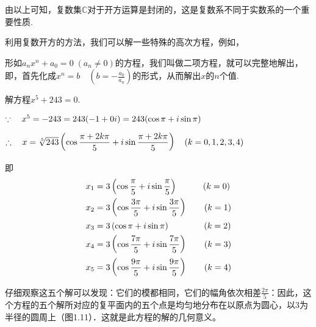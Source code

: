 由以上可知，复数集$\mathbb{C}$对于开方运算是封闭的，这是复数系不同于实数系的一个重要性质.

利用复数开方的方法，我们可以解一些特殊的高次方程，例如，

形如$a_nx^n+a_0=0\; (a_n\ne 0)$的方程，我们叫做二项方程，就可以完整地解出，即，首先化成$x^n=b\quad \left(b=-\frac{a_0}{a_n}\right)$的形式，从而解出$x$的$n$个值.

\begin{example}
    解方程$x^5+243=0$.
\end{example}

\begin{solution}
$\because\quad x^5=-243=243(-1+0i)=243(\cos{\pi}+i\sin{\pi})$

$\therefore\quad x=\sqrt[5]{243}\left(\cos{\dfrac{\pi+2k\pi}{5}}+i\sin{\dfrac{\pi+2k\pi}{5}}\right)\quad (k=0,1,2,3,4)$

即
\[\begin{split}
x_1&=3\left(\cos{\dfrac{\pi}{5}}+i\sin{\dfrac{\pi}{5}}\right)\qquad\quad (k=0)\\
x_2&=3\left(\cos{\dfrac{3\pi}{5}}+i\sin{\dfrac{3\pi}{5}}\right)\qquad (k=1)\\
x_3&=3\left(\cos{\pi}+i\sin{\pi}\right)\qquad\qquad (k=2)\\
x_4&=3\left(\cos{\dfrac{7\pi}{5}}+i\sin{\dfrac{7\pi}{5}}\right)\qquad (k=3)\\
x_5&=3\left(\cos{\dfrac{9\pi}{5}}+i\sin{\dfrac{9\pi}{5}}\right)\qquad (k=4)\\
\end{split}\]
\end{solution}

仔细观察这五个解可以发现：它们的模都相同，它们的幅角依次相差$\frac{2\pi}{5}$：因此，这个方程的五个解所对应的复平面内的五个点是均匀地分布在以原点为圆心，以3为半径的圆周上（图1.11）．这就是此方程的解的几何意义。
\begin{figure}[htp]
    \centering
{}
    \caption{}
\end{figure}

